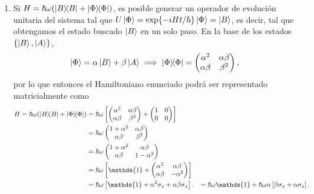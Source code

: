\documentclass{scrartcl}
\DeclareRobustCommand{\[}{\begin{equation}}
\DeclareRobustCommand{\]}{\end{equation}}
\begin{document}
\begin{enumerate}
    \item Si $H = \hbar \omega (\dyad{B}{B} + \dyad{\Phi}{\Phi})$, es posible generar un operador de evolución unitaria del sistema tal que $U \ket{\Phi} = \exp{-iH t / \hbar} \ket{\Phi} = \ket{B}$, es decir, tal que obtengamos el estado buscado $\ket{B}$ en un solo paso. En la base de los estados $\{ \ket{B}, \ket{A} \}$,
    \[ \ket{\Phi} = \alpha \ket{B} + \beta \ket{A} \implies \dyad{\Phi}{\Phi} = \begin{pmatrix} \alpha^2 & \alpha\beta \\ \alpha\beta & \beta^2 \end{pmatrix}, \]
    por lo que entonces el Hamiltoniano enunciado podrá ser representado matricialmente como
    \begin{align}
        H = \hbar \omega (\dyad{B}{B} + \dyad{\Phi}{\Phi}) &= \hbar\omega \left[ \begin{pmatrix} \alpha^2 & \alpha\beta \\ \alpha\beta & \beta^2 \end{pmatrix} + \begin{pmatrix} 1 & 0 \\ 0 & 0 \end{pmatrix} \right] \\
            &= \hbar\omega \begin{pmatrix} 1 + \alpha^2 & \alpha\beta \\ \alpha\beta & \beta^2 \end{pmatrix} \\
            &= \hbar\omega \begin{pmatrix} 1 + \alpha^2 & \alpha\beta \\ \alpha\beta & 1 - \alpha^2 \end{pmatrix} \\
            &= \hbar\omega \left[ \mathds{1} + \begin{pmatrix} \alpha^2 & \alpha\beta \\ \alpha\beta & -\alpha^2 \end{pmatrix} \right] \\
            &= \hbar\omega \left[ \mathds{1} + \alpha^2 \sigma_z + \alpha\beta \sigma_x \right].
            &= \hbar\omega \mathds{1} + \hbar\omega\alpha \left[ \beta \sigma_x + \alpha \sigma_z \right].
    \end{align}
    

\end{enumerate}
\end{document}

